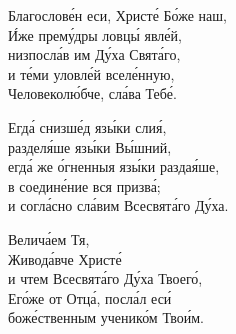 \documentclass{article}
\begin{document}
%
Благослове́н еси, Христе́ Бо́же наш, \\
И́же прему́дры ловцы́ явле́й, \\
низпосла́в им Ду́ха Свята́го, \\
и те́ми уловле́й вселе́нную, \\
Человеколю́бче, сла́ва Тебе́.


Егда́ снизше́д язы́ки слия́, \\
   \cont разделя́ше язы́ки Вы́шний, \\
егда́ же о́гненныя язы́ки раздая́ше, \\
   \cont в соедине́ние вся призва́; \\
и согла́сно сла́вим Всесвята́го Ду́ха.

Велича́ем Тя, \\
Живода́вче Христе́ \\
и чтем Всесвята́го Ду́ха Твоего́, \\
Его́же от Отца́, посла́л еси́ \\
боже́ственным ученико́м Твои́м.
\end{document}
